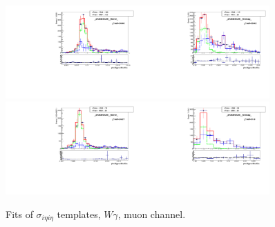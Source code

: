 \begin{figure}[htb]
\begin{center}
   \includegraphics[width=0.45\textwidth]{../figs/figs_v11/MUON_WGamma/TemplateFits/c_TEMPL_SIHIH_UNblind__phoEt25to30__Barrel__RooFit.pdf}\includegraphics[width=0.45\textwidth]{../figs/figs_v11/MUON_WGamma/TemplateFits/c_TEMPL_SIHIH_UNblind__phoEt25to30__Endcap__RooFit.pdf}\\
   \includegraphics[width=0.45\textwidth]{../figs/figs_v11/MUON_WGamma/TemplateFits/c_TEMPL_SIHIH_UNblind__phoEt30to35__Barrel__RooFit.pdf}\includegraphics[width=0.45\textwidth]{../figs/figs_v11/MUON_WGamma/TemplateFits/c_TEMPL_SIHIH_UNblind__phoEt30to35__Endcap__RooFit.pdf}\\
  \label{fig:templateFits_SIHIH_MUON_1}
  \caption{Fits of $\sigma_{i \eta i \eta}$ templates, $W\gamma$, muon channel.}
  \end{center}
\end{figure}

